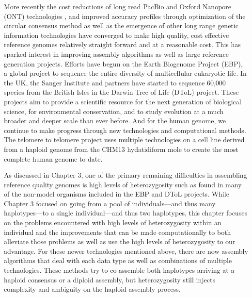 \par{
More recently the cost reductions of long read PacBio and Oxford Nanopore (ONT) technologies\cite{pacbio} \cite{oxford}, and improved accuracy profiles through optimization of the circular consensus method\cite{ccs}\cite{HIFI}
as well as the emergence of other long range genetic information technologies\cite{10xlinked}\cite{HiC}\cite{bionano} 
have converged to make high quality, cost effective reference genomes relatively straight forward and at a reasonable cost. This has sparked interest in improving assembly algorithms 
as well as large reference generation projects. Efforts have begun on the Earth Biogenome Project (EBP)\cite{EBGP}, a global project to sequence the entire diversity of multicellular eukaryotic life. In the UK, the Sanger Institute and partners have started to sequence 60,000 species from the British Isles in the Darwin Tree of Life (DToL) project. These projects aim to provide a scientific resource for the next generation of biological science, for environmental conservation, and to study evolution at a much broader and deeper scale than ever before. And for the human genome, we continue to make progress through new technologies and computational methods\cite{Wenger2019}\cite{tobias1}\cite{eichler1}. The telomere to telomere project uses multiple technologies on a cell line derived from a haploid genome from the CHM13 hydatidiform mole to create the most complete human genome to date\cite{T2T2}\cite{T2T1}.
} 

\par{
As discussed in Chapter 3, one of the primary remaining difficulties in assembling reference quality genomes is high levels of heterozygosity such as found in many of the non-model organisms included in the EBP and DToL projects. While Chapter 3 focused on going from a pool of individuals---and thus many haplotypes---to a single individual---and thus two haplotypes, this chapter focuses on the problems encountered with high levels of heterozygosity within an individual and the improvements that can be made computationally to both alleviate those problems as well as use the high levels of heterozygosity to our advantage. 
For these newer technologies mentioned above, there are now assembly algorithms that deal with each data type\cite{falcon}\cite{supernova}\cite{bionano_assembly} 
as well as combinations of multiple technologies\cite{genemyers}\cite{hybrid10x}\cite{hicscafffirst}\cite{hicassembly}. 
 These methods try to co-assemble both haplotypes arriving at a haploid consensus \cite{watchtower} \cite{canu} 
 or a diploid assembly\cite{falconphase}\cite{supernova}\cite{hifiasm}\cite{dipasm}, but heterozygosity still injects complexity and ambiguity on the haploid assembly process.
} 


